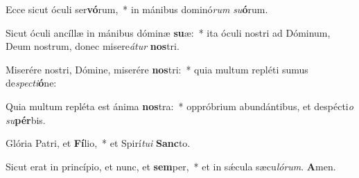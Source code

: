 Ecce sicut óculi ser\textbf{vó}rum,~* in mánibus dominó\textit{rum} \textit{su}\textbf{ó}rum.

Sicut óculi ancíllæ in mánibus dóminæ \textbf{su}æ:~* ita óculi nostri ad Dóminum, Deum nostrum, donec misere\textit{á}\textit{tur} \textbf{nos}tri.

Miserére nostri, Dómine, miserére \textbf{nos}tri:~* quia multum repléti sumus de\textit{spec}\textit{ti}\textbf{ó}ne:

Quia multum repléta est ánima \textbf{nos}tra:~* oppróbrium abundántibus, et despécti\textit{o} \textit{su}\textbf{pér}bis.

Glória Patri, et \textbf{Fí}lio,~* et Spirí\textit{tu}\textit{i} \textbf{Sanc}to.

Sicut erat in princípio, et nunc, et \textbf{sem}per,~* et in sǽcula sæcu\textit{ló}\textit{rum}. \textbf{A}men.

